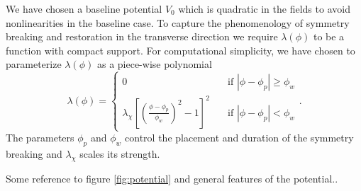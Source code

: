 We have chosen a baseline potential $V_0$ which is quadratic in the fields to avoid nonlinearities in the baseline case.
To capture the phenomenology of symmetry breaking and restoration in the transverse direction we require $\lambda(\phi)$ to be a function with compact support.
For computational simplicity, we have chosen to parameterize $\lambda(\phi)$ as a piece-wise polynomial
\begin{equation} \label{eq:lambda}
  \lambda(\phi) =
  \begin{cases}
    0 & \quad \text{if } |\phi-\phi_p|\ge\phi_w \\
    \lambda_\chi\left[\left(\frac{\phi-\phi_p}{\phi_w}\right)^2 - 1 \right]^2 & \quad \text{if  } |\phi-\phi_p|<\phi_w
  \end{cases}.
\end{equation}
The parameters $\phi_p$ and $\phi_w$ control the placement and duration of the symmetry breaking and $\lambda_\chi$
scales its strength.



Some reference to figure \ref{fig:potential} and general features of the potential..

